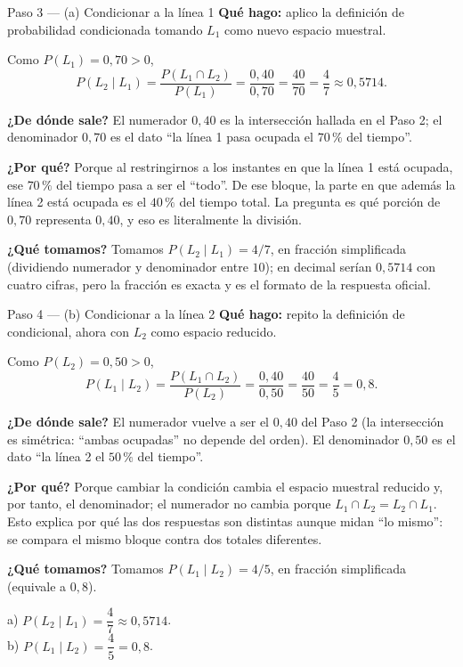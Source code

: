 \documentclass[11pt]{article}
\begin{document}
\begin{paso}{Paso 3 --- (a) Condicionar a la línea 1}
\textbf{Qué hago:} aplico la definición de probabilidad condicionada tomando $L_1$ como nuevo espacio muestral.

Como $P(L_1)=0{,}70>0$,
\[
P(L_2\mid L_1)=\frac{P(L_1\cap L_2)}{P(L_1)}=\frac{0{,}40}{0{,}70}=\frac{40}{70}=\frac{4}{7}\approx 0{,}5714.
\]

\textbf{¿De dónde sale?} El numerador $0{,}40$ es la intersección hallada en el Paso 2; el denominador $0{,}70$ es el dato ``la línea 1 pasa ocupada el $70\,\%$ del tiempo''.

\textbf{¿Por qué?} Porque al restringirnos a los instantes en que la línea 1 está ocupada, ese $70\,\%$ del tiempo pasa a ser el ``todo''. De ese bloque, la parte en que además la línea 2 está ocupada es el $40\,\%$ del tiempo total. La pregunta es qué porción de $0{,}70$ representa $0{,}40$, y eso es literalmente la división.

\textbf{¿Qué tomamos?} Tomamos $P(L_2\mid L_1)=4/7$, en fracción simplificada (dividiendo numerador y denominador entre $10$); en decimal serían $0{,}5714$ con cuatro cifras, pero la fracción es exacta y es el formato de la respuesta oficial.
\end{paso}

\begin{paso}{Paso 4 --- (b) Condicionar a la línea 2}
\textbf{Qué hago:} repito la definición de condicional, ahora con $L_2$ como espacio reducido.

Como $P(L_2)=0{,}50>0$,
\[
P(L_1\mid L_2)=\frac{P(L_1\cap L_2)}{P(L_2)}=\frac{0{,}40}{0{,}50}=\frac{40}{50}=\frac{4}{5}=0{,}8.
\]

\textbf{¿De dónde sale?} El numerador vuelve a ser el $0{,}40$ del Paso 2 (la intersección es simétrica: ``ambas ocupadas'' no depende del orden). El denominador $0{,}50$ es el dato ``la línea 2 el $50\,\%$ del tiempo''.

\textbf{¿Por qué?} Porque cambiar la condición cambia el espacio muestral reducido y, por tanto, el denominador; el numerador no cambia porque $L_1\cap L_2=L_2\cap L_1$. Esto explica por qué las dos respuestas son distintas aunque midan ``lo mismo'': se compara el mismo bloque contra dos totales diferentes.

\textbf{¿Qué tomamos?} Tomamos $P(L_1\mid L_2)=4/5$, en fracción simplificada (equivale a $0{,}8$).
\end{paso}

\begin{resp}
a) $P(L_2\mid L_1)=\dfrac{4}{7}\approx 0{,}5714$.\\[2pt]
b) $P(L_1\mid L_2)=\dfrac{4}{5}=0{,}8$.
\end{resp}
\end{document}
